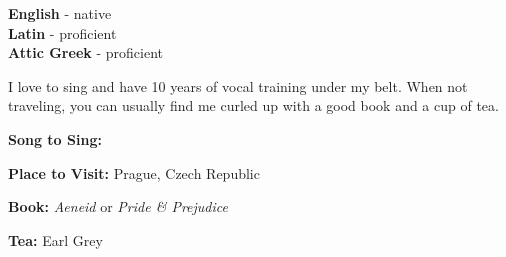 \begin{minipage}[t]{0.2\textwidth}
	\vspace{-\baselineskip} %

	
	\textbf{English} - native\\
	\textbf{Latin} - proficient\\
	\textbf{Attic Greek} - proficient
\end{minipage}
\hfill
\begin{minipage}[t]{0.35\textwidth}
	\vspace{-\baselineskip} %
	
	
	I love to sing and have 10 years of vocal training under my belt. When not traveling, you can usually find me curled up with a good book and a cup of tea. 
\end{minipage}
\hfill
\begin{minipage}[t]{0.35\textwidth}
	\vspace{-\baselineskip} %
	
	
	\textbf{Song to Sing:} 
	
	\textbf{Place to Visit:} Prague, Czech Republic
	
	\textbf{Book:} \textit{Aeneid} or \textit{Pride \& Prejudice}
	
	\textbf{Tea:} Earl Grey
\end{minipage}